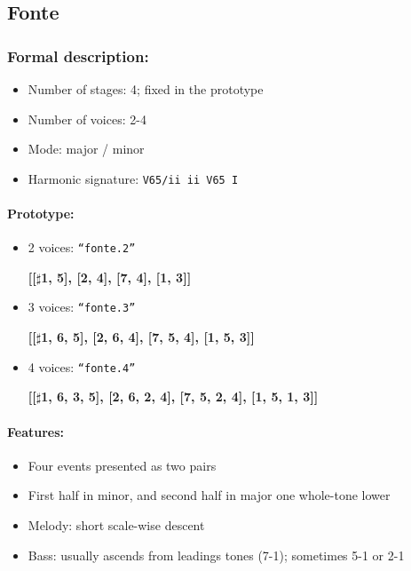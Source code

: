 \documentclass[11pt, openany]{article}
\begin{document}
	\subsection{Fonte}
	
\subsubsection{Formal description:}
\begin{itemize}
\item Number of stages: 4; fixed in the prototype
\item Number of voices: 2-4
\item Mode: major / minor
\item Harmonic signature: \texttt{V65/ii ii V65 I}
\end{itemize}

\paragraph{Prototype:}
\begin{itemize}
\item 2 voices: \texttt{“fonte.2”}
	\begin{center}
	\textbf{[[$\sharp$1, 5], [2, 4], [7, 4], [1, 3]]}
	\end{center}
\item 3 voices: \texttt{“fonte.3”}
	\begin{center}
	\textbf{[[$\sharp$1, 6, 5], [2, 6, 4], [7, 5, 4], [1, 5, 3]]}
	\end{center}
\item 4 voices: \texttt{“fonte.4”}
	\begin{center}
	\textbf{[[$\sharp$1, 6, 3, 5], [2, 6, 2, 4], [7, 5, 2, 4], [1, 5, 1, 3]]}
	\end{center}
\end{itemize}

\paragraph{Features:}
\begin{itemize}
\item Four events presented as two pairs
\item First half in minor, and second half in major one whole-tone lower
\item Melody: short scale-wise descent
\item Bass: usually ascends from leadings tones (7-1); sometimes 5-1 or 2-1
\end{itemize}
\end{document}
